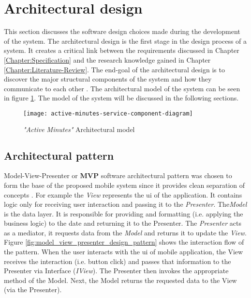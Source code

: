     \section{Architectural design}
    This section discusses the software design choices made during the development of the system. The architectural design is the first stage in the design process of a system. It creates a critical link between the requirements discussed in Chapter \ref{Chapter:Specification} and the research knowledge gained in Chapter \ref{Chapter:Literature-Review}. The end-goal of the architectural design is to discover the major structural components of the system and how they communicate to each other \citep[148]{sommerville2010}. The architectural model of the system can be seen in figure \ref{fig:architectural_design_component_diagram}. The model of the system will be discussed in the following sections.
    
    \begin{figure}[ht]
        \centering
        \texttt{[image: active-minutes-service-component-diagram]}
        \caption{ \textit{"Active Minutes"} Architectural model}
        \label{fig:architectural_design_component_diagram}
    \end{figure}
    
        \subsection{Architectural pattern}
        Model-View-Presenter or \textbf{MVP} software architectural pattern was chosen to form the base of the proposed mobile system since it provides clean separation of concepts \citep[532]{zhang2010}. For example the \textit{View} represents the \gls{ui} of the application. It contains logic only for receiving user interaction and passing it to the \textit{Presenter}. The\textit{Model} is the data layer. It is responsible for providing and formatting (i.e. applying the business logic) to the date and returning it to the Presenter. The \textit{Presenter} acts as a mediator, it requests data from the \textit{Model} and returns it to update the \textit{View}. Figure \ref{fig:model_view_presenter_design_pattern} shows the interaction flow of the pattern. When the user interacts with the \gls{ui} of mobile application, the View receives the interaction (i.e. button click) and passes that information to the Presenter via Interface (\textit{IView}). The Presenter then invokes the appropriate method of the Model. Next, the Model returns the requested data to the View (via the Presenter). 
        
